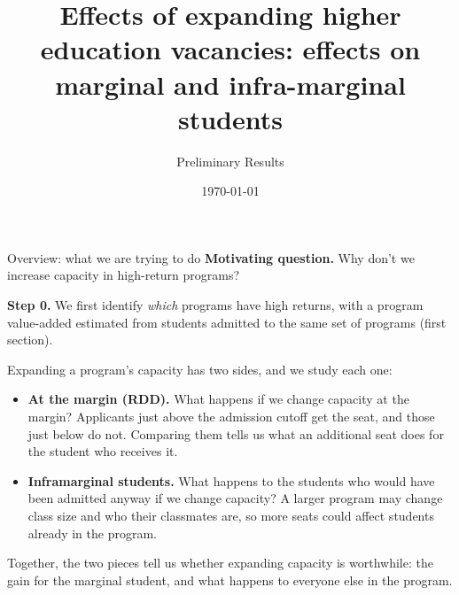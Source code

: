 \documentclass{beamer}
\title[Admission Cutoffs and HE Outcomes]{Effects of expanding higher education vacancies: effects on marginal and infra-marginal students}
\subtitle{Preliminary Results}
\author{}
\date{\today}
\begin{document}
\begin{frame}
  \titlepage
\end{frame}

\begin{frame}{Overview: what we are trying to do}
\small
\textbf{Motivating question.} Why don't we increase capacity in high-return programs?

\vspace{0.3cm}
\textbf{Step 0.} We first identify \emph{which} programs have high returns, with a program value-added estimated from students admitted to the same set of programs (first section).

\vspace{0.3cm}
Expanding a program's capacity has two sides, and we study each one:
\begin{itemize}
    \setlength{\itemsep}{6pt}
    \item \textbf{At the margin (RDD).} What happens if we change capacity at the margin?
    Applicants just above the admission cutoff get the seat, and those just below do not.
    Comparing them tells us what an additional seat does for the student who receives it.
    \item \textbf{Inframarginal students.} What happens to the students who would have been admitted anyway
    if we change capacity? A larger program may change class size and who their classmates are, so more seats could affect students already in the program.
\end{itemize}

\vspace{0.3cm}
Together, the two pieces tell us whether expanding capacity is worthwhile: the gain for the marginal student, and what happens to everyone else in the program.
\end{frame}
\end{document}
